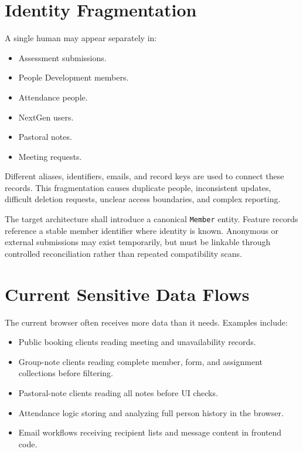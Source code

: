 \documentclass[11pt,a4paper,oneside]{report}
\begin{document}
\section{Identity Fragmentation}

A single human may appear separately in:

\begin{itemize}
  \item Assessment submissions.
  \item People Development members.
  \item Attendance people.
  \item NextGen users.
  \item Pastoral notes.
  \item Meeting requests.
\end{itemize}

Different aliases, identifiers, emails, and record keys are used to connect these records. This fragmentation causes duplicate people, inconsistent updates, difficult deletion requests, unclear access boundaries, and complex reporting.

\begin{decisionbox}
The target architecture shall introduce a canonical \texttt{Member} entity. Feature records reference a stable member identifier where identity is known. Anonymous or external submissions may exist temporarily, but must be linkable through controlled reconciliation rather than repeated compatibility scans.
\end{decisionbox}

\section{Current Sensitive Data Flows}

The current browser often receives more data than it needs. Examples include:

\begin{itemize}
  \item Public booking clients reading meeting and unavailability records.
  \item Group-note clients reading complete member, form, and assignment collections before filtering.
  \item Pastoral-note clients reading all notes before UI checks.
  \item Attendance logic storing and analyzing full person history in the browser.
  \item Email workflows receiving recipient lists and message content in frontend code.
\end{itemize}
\end{document}
